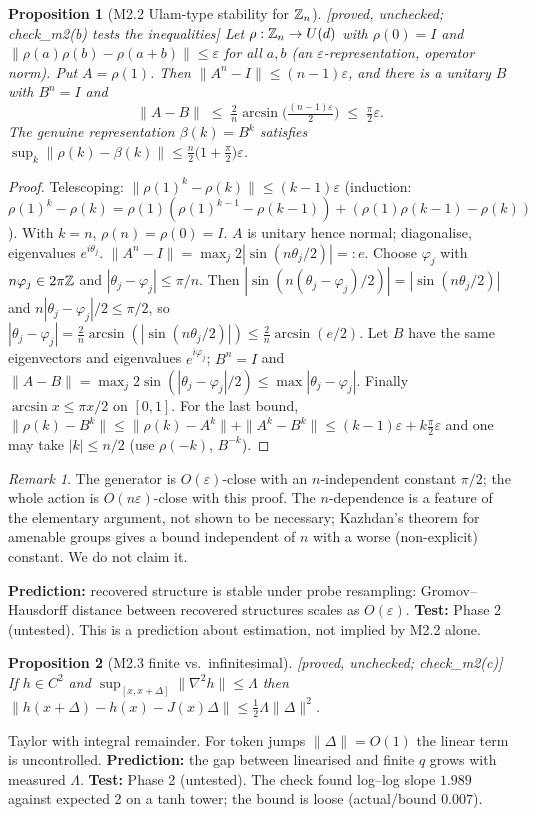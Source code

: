 \documentclass[11pt]{article}
\newtheorem{prop}{Proposition}
\theoremstyle{remark}\newtheorem{rem}{Remark}
\newcommand{\status}[1]{\hfill\textsf{[#1]}}
\begin{document}
\begin{prop}[M2.2 Ulam-type stability for $\mathbb Z_n$]\status{proved, unchecked; check\_m2(b) tests the inequalities}
Let $\rho:\mathbb Z_n\to U(d)$ with $\rho(0)=I$ and $\|\rho(a)\rho(b)-\rho(a+b)\|\le\varepsilon$ for all $a,b$ (an $\varepsilon$-representation, operator norm). Put $A=\rho(1)$. Then $\|A^n-I\|\le(n-1)\varepsilon$, and there is a unitary $B$ with $B^n=I$ and
\[ \|A-B\|\;\le\;\tfrac2n\arcsin\!\bigl(\tfrac{(n-1)\varepsilon}{2}\bigr)\;\le\;\tfrac{\pi}{2}\varepsilon . \]
The genuine representation $\beta(k)=B^k$ satisfies $\sup_{k}\|\rho(k)-\beta(k)\|\le\tfrac n2\bigl(1+\tfrac\pi2\bigr)\varepsilon$.
\end{prop}
\begin{proof}
Telescoping: $\|\rho(1)^k-\rho(k)\|\le(k-1)\varepsilon$ (induction: $\rho(1)^k-\rho(k)=\rho(1)(\rho(1)^{k-1}-\rho(k-1))+(\rho(1)\rho(k-1)-\rho(k))$). With $k=n$, $\rho(n)=\rho(0)=I$. $A$ is unitary hence normal; diagonalise, eigenvalues $e^{i\theta_j}$. $\|A^n-I\|=\max_j2|\sin(n\theta_j/2)|=:e$. Choose $\varphi_j$ with $n\varphi_j\in2\pi\mathbb Z$ and $|\theta_j-\varphi_j|\le\pi/n$. Then $|\sin(n(\theta_j-\varphi_j)/2)|=|\sin(n\theta_j/2)|$ and $n|\theta_j-\varphi_j|/2\le\pi/2$, so $|\theta_j-\varphi_j|=\frac2n\arcsin(|\sin(n\theta_j/2)|)\le\frac2n\arcsin(e/2)$. Let $B$ have the same eigenvectors and eigenvalues $e^{i\varphi_j}$; $B^n=I$ and $\|A-B\|=\max_j2\sin(|\theta_j-\varphi_j|/2)\le\max|\theta_j-\varphi_j|$. Finally $\arcsin x\le\pi x/2$ on $[0,1]$. For the last bound, $\|\rho(k)-B^k\|\le\|\rho(k)-A^k\|+\|A^k-B^k\|\le(k-1)\varepsilon+k\tfrac\pi2\varepsilon$ and one may take $|k|\le n/2$ (use $\rho(-k)$, $B^{-k}$). \qedhere
\end{proof}
\begin{rem}The generator is $O(\varepsilon)$-close with an $n$-independent constant $\pi/2$; the whole action is $O(n\varepsilon)$-close with this proof. The $n$-dependence is a feature of the elementary argument, not shown to be necessary; Kazhdan's theorem for amenable groups gives a bound independent of $n$ with a worse (non-explicit) constant. We do not claim it.\end{rem}
\textbf{Prediction:} recovered structure is stable under probe resampling: Gromov--Hausdorff distance between recovered structures scales as $O(\varepsilon)$. \textbf{Test:} Phase 2 (untested). This is a prediction about estimation, not implied by M2.2 alone.

\begin{prop}[M2.3 finite vs.\ infinitesimal]\status{proved, unchecked; check\_m2(c)}
If $h\in C^2$ and $\sup_{[x,x+\Delta]}\|\nabla^2h\|\le\Lambda$ then $\|h(x+\Delta)-h(x)-J(x)\Delta\|\le\tfrac12\Lambda\|\Delta\|^2$.
\end{prop}
Taylor with integral remainder. For token jumps $\|\Delta\|=O(1)$ the linear term is uncontrolled. \textbf{Prediction:} the gap between linearised and finite $q$ grows with measured $\Lambda$. \textbf{Test:} Phase 2 (untested). The check found log--log slope $1.989$ against expected 2 on a tanh tower; the bound is loose (actual/bound $0.007$).
\end{document}
